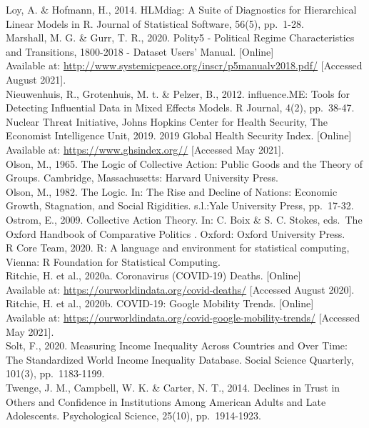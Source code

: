\documentclass[
  11pt,
]{article}
\begin{document}
Loy, A. \& Hofmann, H., 2014. HLMdiag: A Suite of Diagnostics for Hierarchical Linear Models in R. Journal of Statistical Software, 56(5), pp.~1-28.\\
Marshall, M. G. \& Gurr, T. R., 2020. Polity5 - Political Regime Characteristics and Transitions, 1800-2018 - Dataset Users' Manual. {[}Online{]}\\
Available at: \url{http://www.systemicpeace.org/inscr/p5manualv2018.pdf/}
{[}Accessed August 2021{]}.\\
Nieuwenhuis, R., Grotenhuis, M. t. \& Pelzer, B., 2012. influence.ME: Tools for Detecting Influential Data in Mixed Effects Models. R Journal, 4(2), pp.~38-47.\\
Nuclear Threat Initiative, Johns Hopkins Center for Health Security, The Economist Intelligence Unit, 2019. 2019 Global Health Security Index. {[}Online{]}\\
Available at: \url{https://www.ghsindex.org//}
{[}Accessed May 2021{]}.\\
Olson, M., 1965. The Logic of Collective Action: Public Goods and the Theory of Groups. Cambridge, Massachusetts: Harvard University Press.\\
Olson, M., 1982. The Logic. In: The Rise and Decline of Nations: Economic Growth, Stagnation, and Social Rigidities. s.l.:Yale University Press, pp.~17-32.\\
Ostrom, E., 2009. Collective Action Theory. In: C. Boix \& S. C. Stokes, eds.~The Oxford Handbook of Comparative Politics . Oxford: Oxford University Press.\\
R Core Team, 2020. R: A language and environment for statistical computing, Vienna: R Foundation for Statistical Computing.\\
Ritchie, H. et al., 2020a. Coronavirus (COVID-19) Deaths. {[}Online{]}\\
Available at: \url{https://ourworldindata.org/covid-deaths/}
{[}Accessed August 2020{]}.\\
Ritchie, H. et al., 2020b. COVID-19: Google Mobility Trends. {[}Online{]}\\
Available at: \url{https://ourworldindata.org/covid-google-mobility-trends/}
{[}Accessed May 2021{]}.\\
Solt, F., 2020. Measuring Income Inequality Across Countries and Over Time: The Standardized World Income Inequality Database. Social Science Quarterly, 101(3), pp.~1183-1199.\\
Twenge, J. M., Campbell, W. K. \& Carter, N. T., 2014. Declines in Trust in Others and Confidence in Institutions Among American Adults and Late Adolescents. Psychological Science, 25(10), pp.~1914-1923.\\
\end{document}
